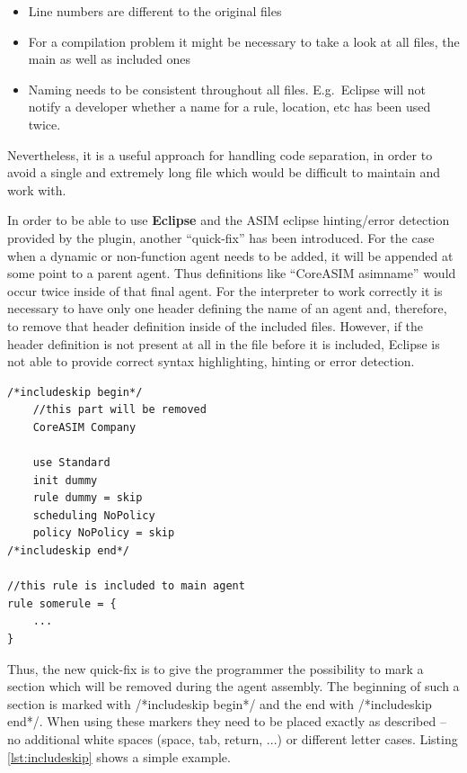 \begin{itemize}
	\item Line numbers are different to the original files
	\item For a compilation problem it might be necessary to take a look at all files, the main as well as included ones
	\item Naming needs to be consistent throughout all files. E.g.\ Eclipse will not notify a developer whether a name for a rule, location, etc has been used twice.
\end{itemize}

Nevertheless, it is a useful approach for handling code separation, in order to avoid a single and extremely long file which would be difficult to maintain and work with.

In order to be able to use \textbf{Eclipse} and the ASIM eclipse hinting/error detection provided by the plugin, another ``quick-fix'' has been introduced. For the case when a dynamic or non-function agent needs to be added, it will be appended at some point to a parent agent. Thus definitions like ``CoreASIM asimname'' would occur twice inside of that final agent. For the interpreter to work correctly it is necessary to have only one header defining the name of an agent and, therefore, to remove that header definition inside of the included files. However, if the header definition is not present at all in the file before it is included, Eclipse is not able to provide correct syntax highlighting, hinting or error detection.

\begin{center}
\begin{minipage}{0.8\textwidth}
\small
\begin{lstlisting}[language=bsl_lst,caption={\bf\small includeskip usage},label=lst:includeskip]
/*includeskip begin*/
	//this part will be removed
	CoreASIM Company

	use Standard 
	init dummy
	rule dummy = skip
	scheduling NoPolicy
	policy NoPolicy = skip
/*includeskip end*/

//this rule is included to main agent
rule somerule = {
	...
}
\end{lstlisting}
\end{minipage}
\end{center}

Thus, the new quick-fix is to give the programmer the possibility to mark a section which will be removed during the agent assembly. The beginning of such a section is marked with \textcolor{eclipseComment}{/*includeskip begin*/} and the end with \textcolor{eclipseComment}{/*includeskip end*/}. When using these markers they need to be placed exactly as described -- no additional white spaces (space, tab, return, ...) or different letter cases. Listing \ref{lst:includeskip} shows a simple example.

